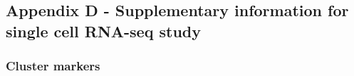 \documentclass[
]{article}
\begin{document}
\clearpage

\subsection{Appendix D - Supplementary information for single cell RNA-seq study}\label{appendix-d---supplementary-information-for-single-cell-rna-seq-study}

\renewcommand{\thefigure}{A5.\arabic{figure}}
\setcounter{figure}{0}
\renewcommand{\thetable}{A5.\arabic{table}}
\setcounter{table}{0}
\renewcommand{\theequation}{A5.\arabic{equation}}
\setcounter{equation}{0}

\captionsetup{width=6.5in}

\subsubsection{Cluster markers}\label{cluster-markers}
\end{document}
